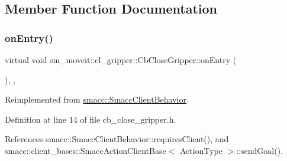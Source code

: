 \subsection{Member Function Documentation}
\mbox{\label{classsm__moveit_1_1cl__gripper_1_1CbCloseGripper_adc772dda477c6370dc41117613e35699}} 
\subsubsection{\texorpdfstring{on\+Entry()}{onEntry()}}
{\footnotesize\ttfamily virtual void sm\+\_\+moveit\+::cl\+\_\+gripper\+::\+Cb\+Close\+Gripper\+::on\+Entry (\begin{DoxyParamCaption}{ }\end{DoxyParamCaption})\hspace{0.3cm}{\ttfamily [inline]}, {\ttfamily [override]}, {\ttfamily [virtual]}}



Reimplemented from \hyperlink{classsmacc_1_1SmaccClientBehavior_a7962382f93987c720ad432fef55b123f}{smacc\+::\+Smacc\+Client\+Behavior}.



Definition at line 14 of file cb\+\_\+close\+\_\+gripper.\+h.



References smacc\+::\+Smacc\+Client\+Behavior\+::requires\+Client(), and smacc\+::client\+\_\+bases\+::\+Smacc\+Action\+Client\+Base$<$ Action\+Type $>$\+::send\+Goal().


